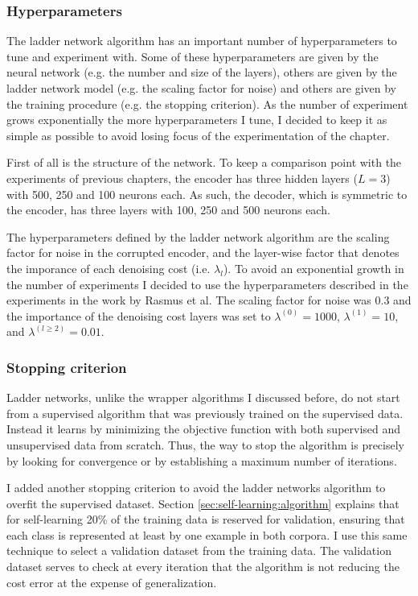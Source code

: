 \subsubsection{Hyperparameters}

The ladder network algorithm has an important number of hyperparameters to tune
and experiment with. Some of these hyperparameters are given by the neural
network (e.g. the number and size of the layers), others are given by the
ladder network model (e.g. the scaling factor for noise) and others are given
by the training procedure (e.g. the stopping criterion). As the number of
experiment grows exponentially the more hyperparameters I tune, I decided to
keep it as simple as possible to avoid losing focus of the experimentation of
the chapter.

First of all is the structure of the network. To keep a comparison point with
the experiments of previous chapters, the encoder has three hidden layers ($L =
3$) with 500, 250 and 100 neurons each. As such, the decoder, which is
symmetric to the encoder, has three layers with 100, 250 and 500 neurons each.

The hyperparameters defined by the ladder network algorithm are the scaling
factor for noise in the corrupted encoder, and the layer-wise factor that
denotes the imporance of each denoising cost (i.e. $\lambda_{l}$). To avoid an
exponential growth in the number of experiments I decided to use the
hyperparameters described in the experiments in the work by Rasmus et al. The
scaling factor for noise was $0.3$ and the importance of the denoising cost
layers was set to $\lambda^{(0)} = 1000$, $\lambda^{(1)} = 10$, and
$\lambda^{(l \geq 2)} = 0.01$.

\subsubsection{Stopping criterion}

Ladder networks, unlike the wrapper algorithms I discussed before, do not start
from a supervised algorithm that was previously trained on the supervised data.
Instead it learns by minimizing the objective function with both supervised and
unsupervised data from scratch. Thus, the way to stop the algorithm is
precisely by looking for convergence or by establishing a maximum number of
iterations.

I added another stopping criterion to avoid the ladder networks algorithm to
overfit the supervised dataset. Section \ref{sec:self-learning:algorithm}
explains that for self-learning 20\% of the training data is reserved for
validation, ensuring that each class is represented at least by one example in
both corpora. I use this same technique to select a validation dataset from the
training data. The validation dataset serves to check at every iteration that
the algorithm is not reducing the cost error at the expense of generalization.

